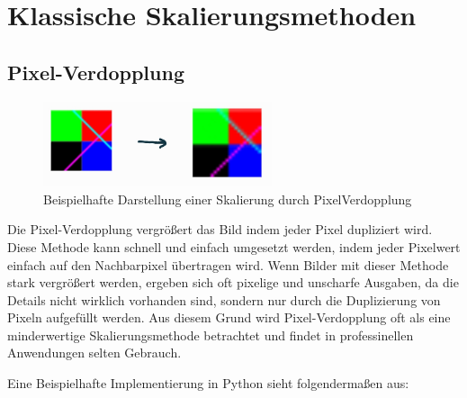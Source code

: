\usepackage{amsmath}
\usepackage{amssymb}
\chapter{Klassische Skalierungsmethoden}

    \section{Pixel-Verdopplung}

        \begin{figure}[h]
            \centering
            \includegraphics[width=0.6\textwidth]{img/so_sieht_pixel_verdopplung_aus.jpg}
            \caption{Beispielhafte Darstellung einer Skalierung durch PixelVerdopplung}
            \label{fig:my_label}
        \end{figure}

        Die Pixel-Verdopplung vergrößert das Bild indem jeder Pixel dupliziert wird.
        Diese Methode kann schnell und einfach umgesetzt werden, indem jeder Pixelwert einfach auf den Nachbarpixel übertragen wird. 
        Wenn Bilder mit dieser Methode stark vergrößert werden, ergeben sich oft pixelige und unscharfe Ausgaben, da die Details nicht wirklich vorhanden sind, sondern nur durch die Duplizierung von Pixeln aufgefüllt werden. 
        Aus diesem Grund wird Pixel-Verdopplung oft als eine minderwertige Skalierungsmethode betrachtet und findet in professinellen Anwendungen selten Gebrauch.


    \newpage
    Eine Beispielhafte Implementierung in Python sieht folgendermaßen aus: 
    
